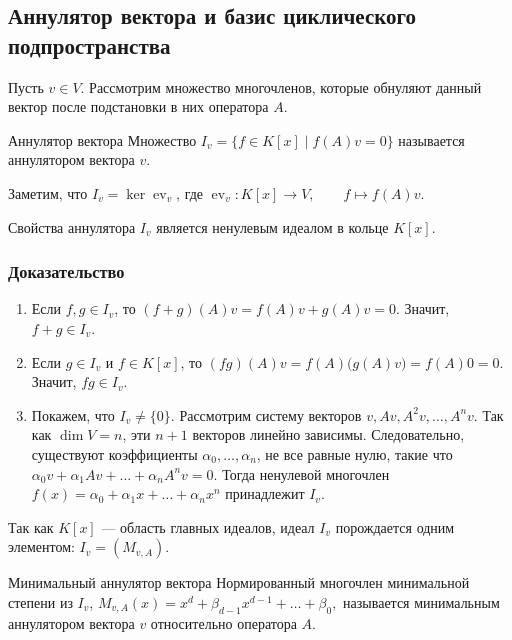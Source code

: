 \subsection{Аннулятор вектора и базис циклического подпространства}

Пусть $v \in V$. Рассмотрим множество многочленов, которые обнуляют данный вектор после подстановки в них оператора $A$.

\begin{Definition}{Аннулятор вектора}{}
	Множество $I_v = \{ f \in K[x] \mid f(A)v = 0 \}$
	называется аннулятором вектора $v$.
	
	Заметим, что $I_v = \ker \operatorname{ev}_v$, где $\operatorname{ev}_v \colon K[x] \to V, \qquad f \mapsto f(A)v.$
\end{Definition}

\begin{Lemma}{Свойства аннулятора}{}
	$I_v$ является ненулевым идеалом в кольце $K[x]$.
\end{Lemma}

\subsubsection*{Доказательство}

\begin{enumerate}
	\item Если $f, g \in I_v$, то $(f + g)(A)v = f(A)v + g(A)v = 0.$
	Значит, $f + g \in I_v$.
	
	\item Если $g \in I_v$ и $f \in K[x]$, то $(fg)(A)v = f(A)\bigl(g(A)v\bigr) = f(A)0 = 0.$
	Значит, $fg \in I_v$.
	
	\item Покажем, что $I_v \neq \{0\}$. Рассмотрим систему векторов $v, Av, A^2v, \dots, A^nv.$
	Так как $\dim V = n$, эти $n+1$ векторов линейно зависимы. Следовательно, существуют коэффициенты $\alpha_0,\dots,\alpha_n$, не все равные нулю, такие что $\alpha_0 v + \alpha_1 Av + \dots + \alpha_n A^nv = 0.$
	Тогда ненулевой многочлен $f(x) = \alpha_0 + \alpha_1x + \dots + \alpha_nx^n$
	принадлежит $I_v$.
\end{enumerate}

Так как $K[x]$ — область главных идеалов, идеал $I_v$ порождается одним элементом: $I_v = (M_{v,A}).$

\begin{Definition}{Минимальный аннулятор вектора}{}
	Нормированный многочлен минимальной степени из $I_v$, $M_{v,A}(x) = x^d + \beta_{d-1}x^{d-1} + \dots + \beta_0,$
	называется минимальным аннулятором вектора $v$ относительно оператора $A$.
\end{Definition}

